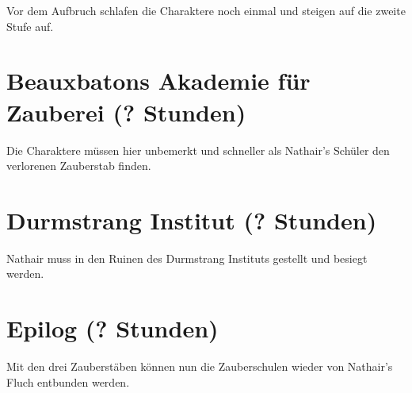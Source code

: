 \documentclass[]{scrartcl}
\begin{document}
Vor dem Aufbruch schlafen die Charaktere noch einmal und steigen auf die zweite Stufe auf.

\section{Beauxbatons Akademie für Zauberei (? Stunden)}

Die Charaktere müssen hier unbemerkt und schneller als Nathair's Schüler den verlorenen Zauberstab finden.

\section{Durmstrang Institut (? Stunden)}

Nathair muss in den Ruinen des Durmstrang Instituts gestellt und besiegt werden.

\section{Epilog (? Stunden)}

Mit den drei Zauberstäben können nun die Zauberschulen wieder von Nathair's Fluch entbunden werden.

\appendix
\end{document}
